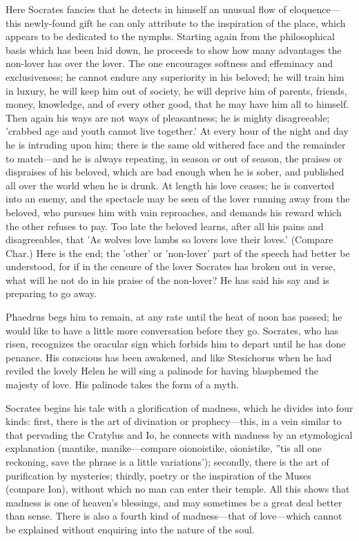 \documentclass[11pt,letter]{article}
\begin{document}
\par  Here Socrates fancies that he detects in himself an unusual flow of eloquence—this newly-found gift he can only attribute to the inspiration of the place, which appears to be dedicated to the nymphs. Starting again from the philosophical basis which has been laid down, he proceeds to show how many advantages the non-lover has over the lover. The one encourages softness and effeminacy and exclusiveness; he cannot endure any superiority in his beloved; he will train him in luxury, he will keep him out of society, he will deprive him of parents, friends, money, knowledge, and of every other good, that he may have him all to himself. Then again his ways are not ways of pleasantness; he is mighty disagreeable; 'crabbed age and youth cannot live together.' At every hour of the night and day he is intruding upon him; there is the same old withered face and the remainder to match—and he is always repeating, in season or out of season, the praises or dispraises of his beloved, which are bad enough when he is sober, and published all over the world when he is drunk. At length his love ceases; he is converted into an enemy, and the spectacle may be seen of the lover running away from the beloved, who pursues him with vain reproaches, and demands his reward which the other refuses to pay. Too late the beloved learns, after all his pains and disagreeables, that 'As wolves love lambs so lovers love their loves.' (Compare Char.) Here is the end; the 'other' or 'non-lover' part of the speech had better be understood, for if in the censure of the lover Socrates has broken out in verse, what will he not do in his praise of the non-lover? He has said his say and is preparing to go away.

\par  Phaedrus begs him to remain, at any rate until the heat of noon has passed; he would like to have a little more conversation before they go. Socrates, who has risen, recognizes the oracular sign which forbids him to depart until he has done penance. His conscious has been awakened, and like Stesichorus when he had reviled the lovely Helen he will sing a palinode for having blasphemed the majesty of love. His palinode takes the form of a myth.

\par  Socrates begins his tale with a glorification of madness, which he divides into four kinds: first, there is the art of divination or prophecy—this, in a vein similar to that pervading the Cratylus and Io, he connects with madness by an etymological explanation (mantike, manike—compare oionoistike, oionistike, ''tis all one reckoning, save the phrase is a little variations'); secondly, there is the art of purification by mysteries; thirdly, poetry or the inspiration of the Muses (compare Ion), without which no man can enter their temple. All this shows that madness is one of heaven's blessings, and may sometimes be a great deal better than sense. There is also a fourth kind of madness—that of love—which cannot be explained without enquiring into the nature of the soul.
\end{document}
